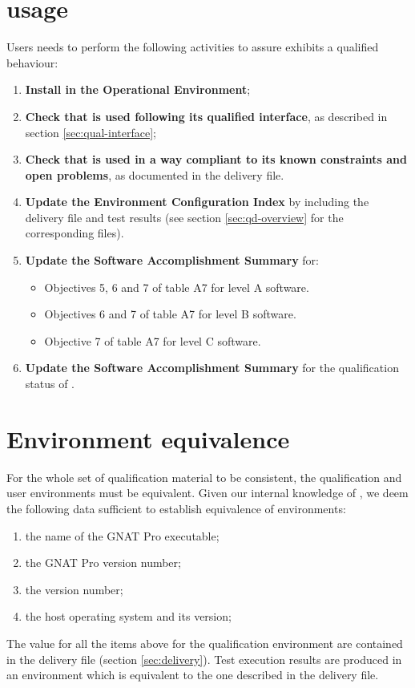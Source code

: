 \documentclass {report}
\begin{document}
\section{\xcov{} usage}

Users needs to perform the following activities to assure \xcov{} exhibits
a qualified behaviour:

\begin{enumerate}
\item \textbf{Install \xcov{} in the Operational Environment};
%
\item \textbf{Check that \xcov{} is used following its qualified interface},
    as described in section \ref{sec:qual-interface};
%
\item \textbf{Check that \xcov{} is used in a way compliant to its known
  constraints and open problems}, as documented in the delivery file.
%
\item \textbf{Update the Environment Configuration Index} by including the delivery file and test results (see section \ref{sec:qd-overview} for the corresponding files).
%
\item \textbf{Update the Software Accomplishment Summary} for:
\begin{itemize}
\item Objectives 5, 6 and 7 of table A7 for level A software.
\item Objectives 6 and 7 of table A7 for level B software.
\item Objective 7 of table A7 for level C software.
\end{itemize}
%
\item \textbf{Update the Software Accomplishment Summary} for the
  qualification status of \xcov{}.
\end{enumerate}

\section{Environment equivalence}
\label{sec:equivalence}

For the whole set of qualification material to be consistent, the
qualification and user environments must be equivalent.
%
Given our internal knowledge of \xcov{}, we deem the following data sufficient
to establish equivalence of environments:

\begin{enumerate}
\item the name of the GNAT Pro executable;
\item the GNAT Pro version number;
\item the \xcov{} version number;
\item the host operating system and its version;
\end{enumerate}

The value for all the items above for the qualification environment are
contained in the delivery file (section \ref{sec:delivery}). Test execution
results are produced in an environment which is equivalent to the one
described in the delivery file.
\end{document}

